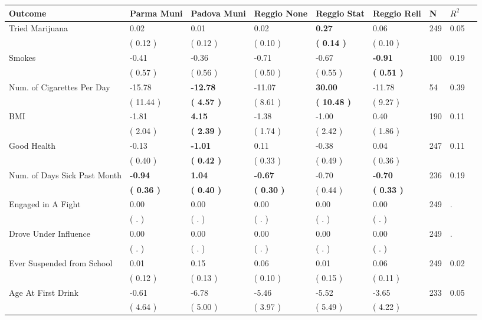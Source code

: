 \begin{tabular}{L{6.2cm} C{1.8cm} C{1.8cm} C{1.8cm} C{1.8cm} C{1.8cm} C{1.8cm} C{0.3cm} C{0.3cm}}
\toprule
 \textbf{Outcome} & \textbf{Parma Muni} & \textbf{Padova Muni} & \textbf{Reggio None} & \textbf{Reggio Stat} & \textbf{Reggio Reli} & \textbf{N} & \textbf{$ R^2$} \\
\midrule
Tried Marijuana &      0.02 &      0.01 &      0.02 & \textbf{     0.27} &      0.06  & 249 &       0.05 \\ 
 & (     0.12 ) & (     0.12 ) & (     0.10 ) & \textbf{(     0.14 )} & (     0.10 )  & \\
Smokes &     -0.41 &     -0.36 &     -0.71 &     -0.67 & \textbf{    -0.91}  & 100 &       0.19 \\ 
 & (     0.57 ) & (     0.56 ) & (     0.50 ) & (     0.55 ) & \textbf{(     0.51 )}  & \\
Num. of Cigarettes Per Day &    -15.78 & \textbf{   -12.78} &    -11.07 & \textbf{    30.00} &    -11.78  & 54 &       0.39 \\ 
 & (    11.44 ) & \textbf{(     4.57 )} & (     8.61 ) & \textbf{(    10.48 )} & (     9.27 )  & \\
BMI &     -1.81 & \textbf{     4.15} &     -1.38 &     -1.00 &      0.40  & 190 &       0.11 \\ 
 & (     2.04 ) & \textbf{(     2.39 )} & (     1.74 ) & (     2.42 ) & (     1.86 )  & \\
Good Health &     -0.13 & \textbf{    -1.01} &      0.11 &     -0.38 &      0.04  & 247 &       0.11 \\ 
 & (     0.40 ) & \textbf{(     0.42 )} & (     0.33 ) & (     0.49 ) & (     0.36 )  & \\
Num. of Days Sick Past Month & \textbf{    -0.94} & \textbf{     1.04} & \textbf{    -0.67} &     -0.70 & \textbf{    -0.70}  & 236 &       0.19 \\ 
 & \textbf{(     0.36 )} & \textbf{(     0.40 )} & \textbf{(     0.30 )} & (     0.44 ) & \textbf{(     0.33 )}  & \\
Engaged in A Fight &      0.00 &      0.00 &      0.00 &      0.00 &      0.00  & 249 &          . \\ 
 & (        . ) & (        . ) & (        . ) & (        . ) & (        . )  & \\
Drove Under Influence &      0.00 &      0.00 &      0.00 &      0.00 &      0.00  & 249 &          . \\ 
 & (        . ) & (        . ) & (        . ) & (        . ) & (        . )  & \\
Ever Suspended from School &      0.01 &      0.15 &      0.06 &      0.01 &      0.06  & 249 &       0.02 \\ 
 & (     0.12 ) & (     0.13 ) & (     0.10 ) & (     0.15 ) & (     0.11 )  & \\
Age At First Drink &     -0.61 &     -6.78 &     -5.46 &     -5.52 &     -3.65  & 233 &       0.05 \\ 
 & (     4.64 ) & (     5.00 ) & (     3.97 ) & (     5.49 ) & (     4.22 )  & \\
\bottomrule
\end{tabular}
